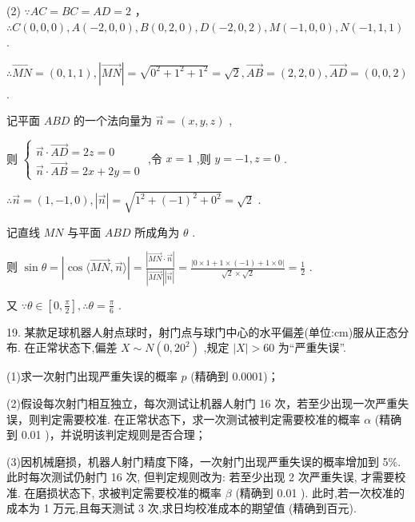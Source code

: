 \documentclass[10pt]{article}
\begin{document}
(2) \(\because {AC} = {BC} = {AD} = 2\) ， \(\therefore C\left( {0,0,0}\right) ,A\left( {-2,0,0}\right) ,B\left( {0,2,0}\right) ,D\left( {-2,0,2}\right) ,M\left( {-1,0,0}\right) ,N\left( {-1,1,1}\right)\) .

\(\therefore \overrightarrow{MN} = \left( {0,1,1}\right) ,\left| \overrightarrow{MN}\right|  = \sqrt{{0}^{2} + {1}^{2} + {1}^{2}} = \sqrt{2},\overrightarrow{AB} = \left( {2,2,0}\right) ,\overrightarrow{AD} = \left( {0,0,2}\right)\) .

记平面 \({ABD}\) 的一个法向量为 \(\overrightarrow{n} = \left( {x,y,z}\right)\) ,

则 \(\left\{  \begin{matrix} \overrightarrow{n} \cdot  \overrightarrow{AD} = {2z} = 0 \\  \overrightarrow{n} \cdot  \overrightarrow{AB} = {2x} + {2y} = 0 \end{matrix}\right.\) ,令 \(x = 1\) ,则 \(y =  - 1,z = 0\) .

\(\therefore \overrightarrow{n} = \left( {1, - 1,0}\right) ,\left| \overrightarrow{n}\right|  = \sqrt{{1}^{2} + {\left( -1\right) }^{2} + {0}^{2}} = \sqrt{2}\) .

记直线 \({MN}\) 与平面 \({ABD}\) 所成角为 \(\theta\) .

则 \(\sin \theta  = \left| {\cos \langle \overrightarrow{MN},\overrightarrow{n}\rangle }\right|  = \frac{\left| \overrightarrow{MN} \cdot  \overrightarrow{n}\right| }{\left| \overrightarrow{MN}\right| \left| \overrightarrow{n}\right| } = \frac{\left| 0 \times  1 + 1 \times  \left( -1\right)  + 1 \times  0\right| }{\sqrt{2} \times  \sqrt{2}} = \frac{1}{2}\) .

又 \(\because \theta  \in  \left\lbrack  {0,\frac{\pi }{2}}\right\rbrack  ,\therefore \theta  = \frac{\pi }{6}\) .

19. 某款足球机器人射点球时，射门点与球门中心的水平偏差(单位:cm)服从正态分布. 在正常状态下,偏差 \(X \sim  N\left( {0,{20}^{2}}\right)\) ,规定 \(\left| X\right|  > {60}\) 为“严重失误”.

(1)求一次射门出现严重失误的概率 \(p\) (精确到 0.0001)；

(2)假设每次射门相互独立，每次测试让机器人射门 16 次，若至少出现一次严重失误，则判定需要校准. 在正常状态下，求一次测试被判定需要校准的概率 \(\alpha\) (精确到 0.01 )，并说明该判定规则是否合理；

(3)因机械磨损，机器人射门精度下降，一次射门出现严重失误的概率增加到 5\%. 此时每次测试仍射门 16 次, 但判定规则改为: 若至少出现 2 次严重失误, 才需要校准. 在磨损状态下, 求被判定需要校准的概率 \(\beta\) (精确到 0.01 ). 此时,若一次校准的成本为 1 万元,且每天测试 3 次,求日均校准成本的期望值 (精确到百元).
\end{document}
